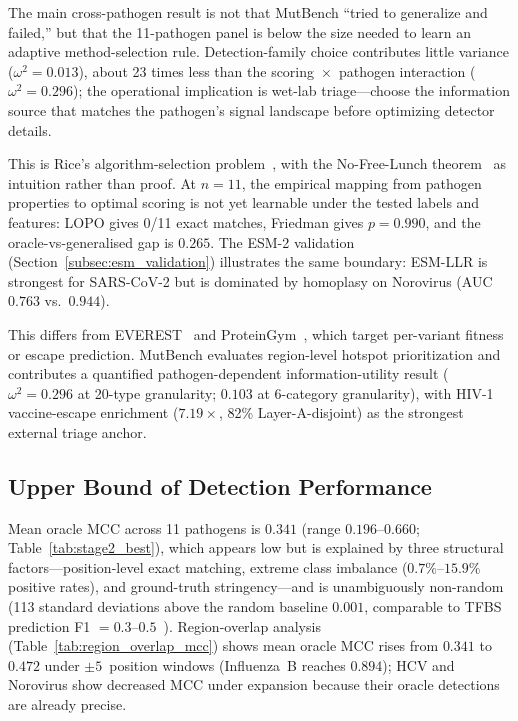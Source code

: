 The main cross-pathogen result is not that MutBench ``tried to generalize and failed,'' but that the 11-pathogen panel is below the size needed to learn an adaptive method-selection rule. Detection-family choice contributes little variance ($\omega^2=0.013$), about 23 times less than the scoring~$\times$~pathogen interaction ($\omega^2=0.296$); the operational implication is wet-lab triage---choose the information source that matches the pathogen's signal landscape before optimizing detector details.

This is Rice's algorithm-selection problem~\cite{rice1976algorithm}, with the No-Free-Lunch theorem~\cite{wolpert1997nfl} as intuition rather than proof. At $n=11$, the empirical mapping from pathogen properties to optimal scoring is not yet learnable under the tested labels and features: LOPO gives 0/11 exact matches, Friedman gives $p=0.990$, and the oracle-vs-generalised gap is $0.265$. The ESM-2 validation (Section~\ref{subsec:esm_validation}) illustrates the same boundary: ESM-LLR is strongest for SARS-CoV-2 but is dominated by homoplasy on Norovirus (AUC $0.763$ vs.\ $0.944$).

This differs from EVEREST~\cite{gurev2025everest} and ProteinGym~\cite{notin2023proteingym}, which target per-variant fitness or escape prediction. MutBench evaluates region-level hotspot prioritization and contributes a quantified pathogen-dependent information-utility result ($\omega^2=0.296$ at 20-type granularity; $0.103$ at 6-category granularity), with HIV-1 vaccine-escape enrichment ($7.19\times$, 82\% Layer-A-disjoint) as the strongest external triage anchor.\label{sec:comparison_prior_work}

\subsection{Upper Bound of Detection Performance}
\label{sec:oracle_mcc_ceiling}

Mean oracle MCC across 11 pathogens is $0.341$ (range $0.196$--$0.660$; Table~\ref{tab:stage2_best}), which appears low but is explained by three structural factors---position-level exact matching, extreme class imbalance ($0.7\%$--$15.9\%$ positive rates), and ground-truth stringency---and is unambiguously non-random (113 standard deviations above the random baseline $0.001$, comparable to TFBS prediction F1 $= 0.3$--$0.5$~\cite{weirauch2013evaluation}). Region-overlap analysis (Table~\ref{tab:region_overlap_mcc}) shows mean oracle MCC rises from $0.341$ to $0.472$ under $\pm 5$~position windows (Influenza~B reaches $0.894$); HCV and Norovirus show decreased MCC under expansion because their oracle detections are already precise.


